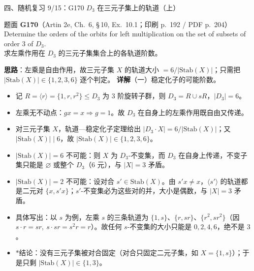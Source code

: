 \documentclass[aspectratio=169,10pt,fontset=none]{ctexbeamer}
\newcommand{\ex}[1]{\textcolor{accent}{\footnotesize\bfseries #1}}
\newcommand{\key}[1]{\textcolor{ink}{\bfseries #1}}
\newcommand{\starpt}{\textcolor{accent}{\bfseries$\ast$}}
\begin{document}
\begin{frame}[t]{四、随机复习 9/15：G170 $D_3$ 在三元子集上的轨道（上）}
\label{ex:G170}
\scriptsize
\begin{block}{\footnotesize 题面 \ex{G170}（Artin 2e, Ch.~6, \S\,10, Ex.~10.1；印刷 p.~192 / PDF p.~204）}
Determine the orders of the orbits for left multiplication on the set of subsets of order $3$ of $D_3$.\\
求左乘作用在 $D_3$ 的三元子集集合上的各轨道阶数。
\end{block}
\key{思路}：左乘是自由作用，故三元子集 $X$ 的轨道大小 $=6/|\mathrm{Stab}(X)|$；只需把 $|\mathrm{Stab}(X)|\in\{1,2,3,6\}$ 逐个判定。
\key{详解}（一）稳定化子的可能阶数。
\begin{itemize}\setlength{\itemsep}{1pt}\setlength{\parsep}{0pt}
\item 记 $R=\langle r\rangle=\{1,r,r^2\}\le D_3$ 为 $3$ 阶旋转子群，则 $D_3=R\cup sR$，$|D_3|=6$。
\item 左乘无不动点：$gx=x\Rightarrow g=1$。故 $D_3$ 在自身上的左乘作用既自由又传递。
\item 对三元子集 $X$，轨道—稳定化子定理给出 $|D_3\cdot X|=6/|\mathrm{Stab}(X)|$；又 $|\mathrm{Stab}(X)|\mid 6$，故 $|\mathrm{Stab}(X)|\in\{1,2,3,6\}$。
\item $|\mathrm{Stab}(X)|=6$ 不可能：则 $X$ 为 $D_3$-不变集，而 $D_3$ 在自身上传递，不变子集只能是 $\varnothing$ 或整个 $D_3$（$6$ 元），与 $|X|=3$ 矛盾。
\item $|\mathrm{Stab}(X)|=2$ 不可能：设对合 $s'\in\mathrm{Stab}(X)$。由 $s'x\ne x$，$\langle s'\rangle$ 的轨道都是二元对 $\{x,s'x\}$；$s'$-不变集必为这些对的并，大小是偶数，与 $|X|=3$ 矛盾。
\item 具体写出：以 $s$ 为例，左乘 $s$ 的三条轨道为 $\{1,s\}$、$\{r,sr\}$、$\{r^2,sr^2\}$（因 $s\cdot r=sr,\ s\cdot sr=s^2r=r$）。故任何 $s$-不变集的大小只能是 $0,2,4,6$，绝不是 $3$。
\item \starpt 结论：没有三元子集被对合固定（对合只固定二元子集，如 $X=\{1,s\}$）；于是只剩 $|\mathrm{Stab}(X)|\in\{1,3\}$。
\end{itemize}
\end{frame}
\end{document}
